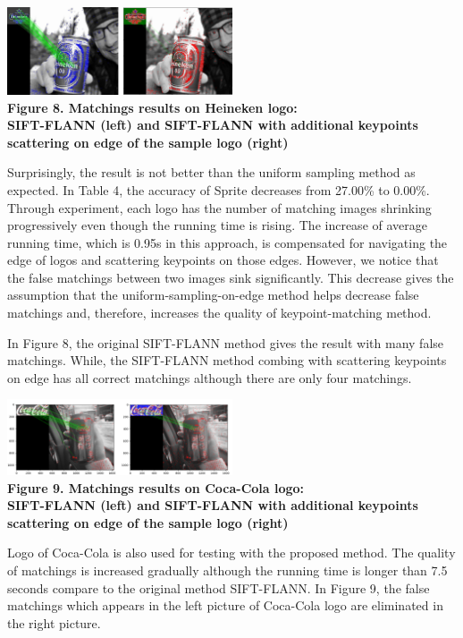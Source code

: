 \documentclass[letterpaper, 10 pt, conference]{ieeeconf}  %
\begin{document}
\begin{center}
\includegraphics[width=0.5\textwidth]{sosanhheneken.png} \\
\textbf{Figure 8. Matchings results on Heineken logo:\\ SIFT-FLANN (left) and SIFT-FLANN with additional keypoints scattering on edge of the sample logo (right)}
\end{center}
\par
Surprisingly, the result is not better than the uniform sampling method as expected. In Table 4, the accuracy of Sprite decreases from 27.00\% to 0.00\%. Through experiment, each logo has the number of matching images shrinking progressively even though the running time is rising. The increase of average running time, which is 0.95s in this approach, is compensated for navigating the edge of logos and scattering keypoints on those edges. However, we notice that the false matchings between two images sink significantly. This decrease gives the assumption that the uniform-sampling-on-edge method helps decrease false matchings and, therefore, increases the quality of keypoint-matching method.\par
In Figure 8, the original SIFT-FLANN method gives the result with many false matchings. While, the SIFT-FLANN method combing with scattering keypoints on edge has all correct matchings although there are only four matchings.\par
\begin{center}
\includegraphics[width=0.5\textwidth]{sosancocacola.png} \\
\textbf{Figure 9. Matchings results on Coca-Cola logo:\\ SIFT-FLANN (left) and SIFT-FLANN with additional keypoints scattering on edge of the sample logo (right)}
\end{center}
\par
Logo of Coca-Cola is also used for testing with the proposed method. The quality of matchings is increased gradually although the running time is longer than 7.5 seconds compare to the original method SIFT-FLANN. In Figure 9, the false matchings which appears in the left picture of Coca-Cola logo are eliminated in the right picture.\par
\end{document}
